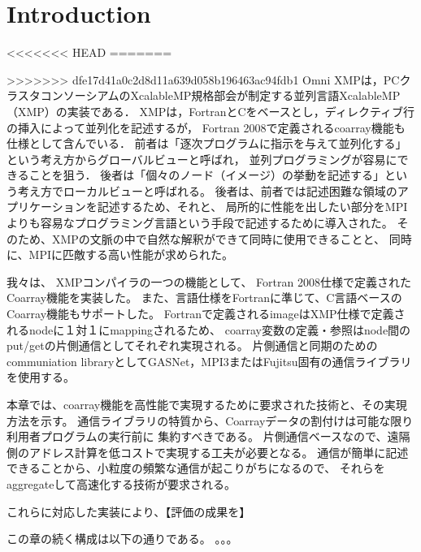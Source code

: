 \section{Introduction}\label{chap:intro}

\setcounter{page}{1}

<<<<<<< HEAD
=======

>>>>>>> dfe17d41a0c2d8d11a639d058b196463ac94fdb1
Omni XMPは，PCクラスタコンソーシアムのXcalableMP規格部会が制定する並列言語XcalableMP（XMP）の実装である．
XMPは，FortranとCをベースとし，ディレクティブ行の挿入によって並列化を記述するが，
Fortran 2008で定義されるcoarray機能も仕様として含んでいる．
前者は「逐次プログラムに指示を与えて並列化する」という考え方からグローバルビューと呼ばれ，
並列プログラミングが容易にできることを狙う．
後者は「個々のノード（イメージ）の挙動を記述する」という考え方でローカルビューと呼ばれる。
後者は、前者では記述困難な領域のアプリケーションを記述するため、それと、
局所的に性能を出したい部分をMPIよりも容易なプログラミング言語という手段で記述するために導入された。
そのため、XMPの文脈の中で自然な解釈ができて同時に使用できることと、
同時に、MPIに匹敵する高い性能が求められた。

我々は、
XMPコンパイラの一つの機能として、
Fortran 2008仕様で定義されたCoarray機能を実装した。
また、言語仕様をFortranに準じて、C言語ベースのCoarray機能もサポートした。
Fortranで定義されるimageはXMP仕様で定義されるnodeに１対１にmappingされるため、
coarray変数の定義・参照はnode間のput/getの片側通信としてそれぞれ実現される。
片側通信と同期のためのcommuniation libraryとしてGASNet，MPI3またはFujitsu固有の通信ライブラリを使用する。

本章では、coarray機能を高性能で実現するために要求された技術と、その実現方法を示す。
通信ライブラリの特質から、Coarrayデータの割付けは可能な限り利用者プログラムの実行前に
集約すべきである。
片側通信ベースなので、遠隔側のアドレス計算を低コストで実現する工夫が必要となる。
通信が簡単に記述できることから、小粒度の頻繁な通信が起こりがちになるので、
それらをaggregateして高速化する技術が要求される。

これらに対応した実装により、【評価の成果を】


この章の続く構成は以下の通りである。
。。。
